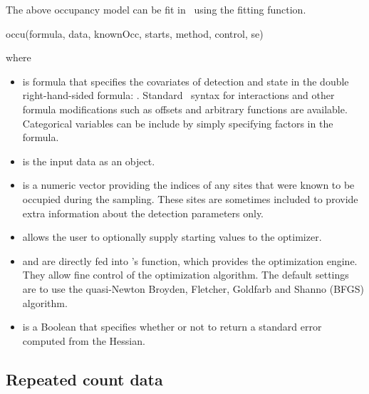 \documentclass[article,shortnames]{jss}
\newcommand{\um}{\pkg{unmarked}}
\newcommand{\rlang}{\proglang{R}}
\begin{document}
The above occupancy model can be fit in \um\ using the 
fitting function.
\begin{Code}
  occu(formula, data, knownOcc, starts, method, control, se)
\end{Code}
where 
\begin{itemize}
\item {} is formula that specifies the covariates of
  detection and state in the double right-hand-sided formula: .  Standard \rlang\ syntax for
  interactions and other formula modifications such as offsets and
  arbitrary functions are available.  Categorical variables can be
  include by simply specifying factors in the formula.
\item {} is the input data as an
   object.
\item {} is a numeric vector providing the indices of
  any sites that were known to be occupied during the sampling.
  These sites are sometimes included to provide extra information
  about the detection parameters only.
\item {} allows the user to optionally supply starting
  values to the optimizer.
\item {} and  are directly fed into
  \rlang's  function, which provides the optimization
  engine.  They allow fine control of the optimization algorithm.
  The default settings are to use the quasi-Newton Broyden,
  Fletcher, Goldfarb and Shanno (BFGS) algorithm.
\item {} is a Boolean that specifies whether or not to
  return a standard error computed from the Hessian.
\end{itemize}



\subsection{Repeated count data}
\label{sec:repeated-count-data}
\end{document}

